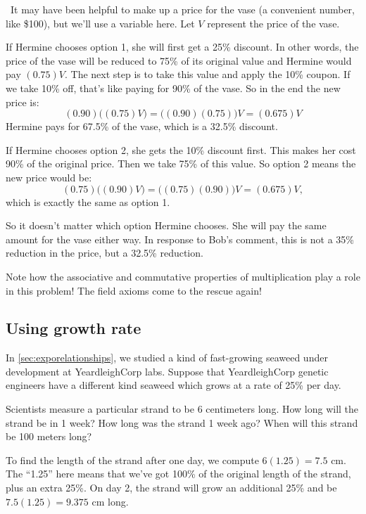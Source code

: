 \begin{boxedex}
\exsoln\ It may have been helpful to make up a price for the vase (a convenient number, like \$100), but we'll use a variable here. Let $V$ represent the price of the vase.

If Hermine chooses option 1, she will first get a 25\% discount. In other words, the price of the vase will be reduced to 75\% of its original value and Hermine would pay $(0.75)V$. The next step is to take this value and apply the 10\% coupon. If we take 10\% off, that's like paying for 90\% of the vase. So in the end the new price is: \[(0.90)\bigl((0.75)V\bigr) = \bigl((0.90)(0.75)\bigr)V= (0.675)V\] Hermine pays for 67.5\% of the vase, which is a 32.5\% discount.

If Hermine chooses option 2, she gets the 10\% discount first. This makes her cost 90\% of the original price. Then we take 75\% of this value. So option 2 means the new price would be: \[(0.75)\bigl((0.90)V\bigr) = \bigl((0.75)(0.90)\bigr)V = (0.675)V,\] which is exactly the same as option 1.

So it doesn't matter which option Hermine chooses. She will pay the same amount for the vase either way. In response to Bob's comment, this is not a 35\% reduction in the price, but a 32.5\% reduction.
\end{boxedex}

Note how the associative and commutative properties of multiplication play a role in this problem! The field axioms come to the rescue again!

\subsection{Using growth rate}

In \cref{sec:exporelationships}, we studied a kind of fast-growing seaweed under development at YeardleighCorp labs. Suppose that YeardleighCorp genetic engineers have a different kind seaweed which grows at a rate of 25\% per day.

Scientists measure a particular strand to be 6 centimeters long. How long will the strand be in 1 week? How long was the strand 1 week ago? When will this strand be 100 meters long?

To find the length of the strand after one day, we compute $6(1.25) = 7.5$ cm. The ``1.25'' here means that we've got 100\% of the original length of the strand, plus an extra 25\%. On day 2, the strand will grow an additional 25\% and be $7.5(1.25) = 9.375$ cm long.

